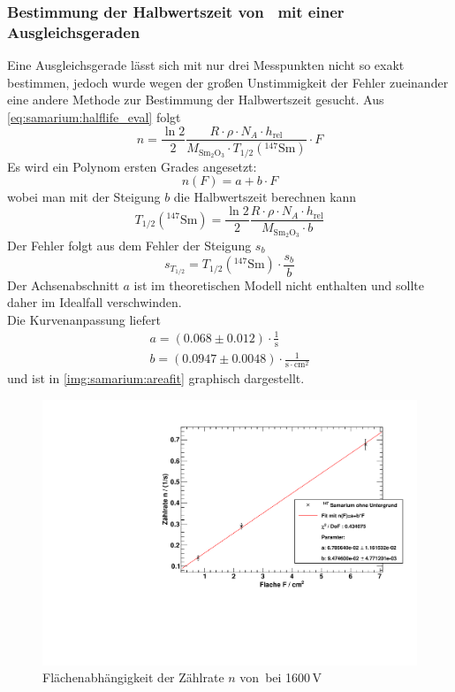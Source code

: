 \subsubsection{Bestimmung der Halbwertszeit von \samarium ~mit einer Ausgleichsgeraden}
Eine Ausgleichsgerade lässt sich mit nur drei Messpunkten nicht so exakt bestimmen, jedoch wurde wegen der großen Unstimmigkeit der Fehler 
zueinander eine andere Methode zur Bestimmung der Halbwertszeit gesucht.
Aus \autoref{eq:samarium:halflife_eval} folgt
\begin{equation}
   n = \frac{\ln 2}{2} \frac{R \cdot \rho \cdot N_A \cdot h_{\text{rel}}}{M_{\text{Sm}_2\text{O}_3} \cdot T_{1/2}({}^{147}\text{Sm})} \cdot F
\end{equation}
Es wird ein Polynom ersten Grades angesetzt:
\begin{equation}
  n(F) = a + b \cdot F
\end{equation}
wobei man mit der Steigung $b$ die Halbwertszeit berechnen kann
\begin{equation}
  T_{1/2}({}^{147}\text{Sm}) = \frac{\ln 2}{2} \frac{R \cdot \rho \cdot N_A \cdot h_{\text{rel}}}{M_{\text{Sm}_2\text{O}_3} \cdot b}
\end{equation}
Der Fehler folgt aus dem Fehler der Steigung $s_b$
\begin{equation}
  s_{T_{1/2}} = T_{1/2}({}^{147}\text{Sm}) \cdot \frac{s_b}{b}
\end{equation}
Der Achsenabschnitt $a$ ist im theoretischen Modell nicht enthalten und sollte daher im Idealfall verschwinden. \\[\baselineskip]
Die Kurvenanpassung liefert
\begin{gather}
  a = (0.068  \pm 0.012 ) \cdot \frac{1}{\text{s}} \\
  b = (0.0947 \pm 0.0048) \cdot \frac{1}{\text{s}\cdot \text{cm}^2}
\end{gather}
und ist in \autoref{img:samarium:areafit} graphisch dargestellt. 
\begin{figure}[H]
\begin{center}
  \includegraphics[width=15cm]{../img/Samarium147-Flaechenabhaengigkeit.pdf}
  \caption[Flächenabhängigkeit von \samarium]{Flächenabhängigkeit der Zählrate $n$ von \samarium\,bei 1600\,V}
  \label{img:samarium:areafit}
\end{center}
\end{figure}

